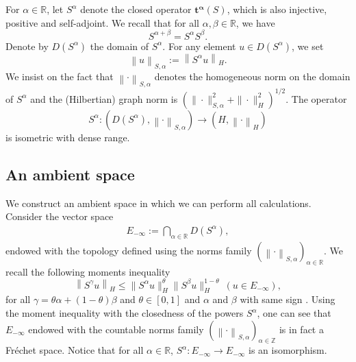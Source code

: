 \documentclass[11pt, letterpaper]{amsart}
\theoremstyle{definition}
\theoremstyle{remark}
\numberwithin{equation}{section}
\begin{document}
For $\alpha \in \mathbb{R}$, let $S^{\alpha}$ denote the closed operator $\mathbf{t^{\alpha}}(S)$, which is also injective, positive and self-adjoint. We recall that for all $\alpha, \beta \in \mathbb{R}$, we have 
$$S^{\alpha+\beta}=S^\alpha S^\beta.$$
Denote by $D(S^{\alpha})$ the domain of $S^{\alpha}$. For any element $u\in D(S^\alpha)$, we set
\begin{equation*}
    \left\| u \right\|_{S,\alpha}:=\left\|S^{\alpha}u \right\|_H.
\end{equation*}
We insist on the fact that $\left\| \cdot \right\|_{S,\alpha}$ denotes the homogeneous norm on the domain of $S^\alpha$ and the (Hilbertian) graph norm is 
$(\| \cdot \|_{S,\alpha}^2+ \|\cdot \|_H^2)^{1/2}$. The operator 
\begin{equation}\label{Salpha}
    S^{\alpha}:  (D(S^{\alpha}),  \left\| \cdot \right\|_{S,\alpha}  ) \rightarrow \left ( H, \left\| \cdot \right\|_H \right )
\end{equation}
is isometric with dense range. 
\subsection{An ambient space 
}
We construct an ambient space  in which we can perform all calculations.
Consider the vector space
\begin{align*}
    E_{-\infty}:= \bigcap_{\alpha \in \mathbb{R}} D(S^{\alpha }),
\end{align*}
 endowed with the topology defined using the norms family $(\left\| \cdot \right\|_{S,\alpha} )_{\alpha \in \mathbb{R}}$.
 We recall the following moments inequality 
 \begin{equation*}
    \left \| S^\gamma u \right \|_H\leq   \| S^\alpha u  \|_H^\theta  \| S^\beta u  \|_H^{1-\theta } \ (u \in E_{-\infty}), 
 \end{equation*}
 for all $\gamma=\theta \alpha +(1-\theta)\beta$ and $\theta \in [0,1]$ and $\alpha$ and $\beta$ with same sign \cite[Proposition 6.6.4]{haase2006functional}. Using the moment inequality with the closedness of the powers $S^\alpha$, one can see that $E_{-\infty}$ endowed with the countable norms family $(\left\| \cdot \right\|_{S,\alpha} )_{\alpha \in \mathbb{Z}}$ is in fact a Fr\'echet space. Notice that for all $\alpha \in \mathbb{R}$, $S^{\alpha} : E_{-\infty} \rightarrow E_{-\infty}$ is an isomorphism.
 
\end{document}
